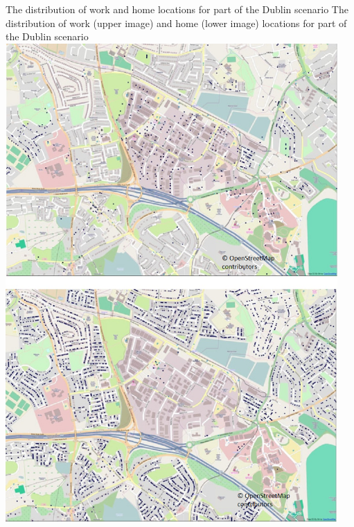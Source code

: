 \createfigure%
{The distribution of work and home locations for part of the Dublin scenario}%
{The distribution of work (upper image) and home (lower image) locations for part of the Dublin scenario}%
{\label{fig:dublin0}}%
{\includegraphics[width=0.95\textwidth, angle=0]{scenarios/figures/dublin0.png}}%
{}

